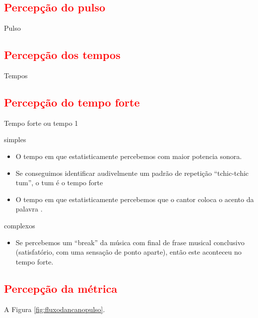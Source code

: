 \subsection{\textcolor{red}{Percepção do pulso}}
Pulso


\subsection{\textcolor{red}{Percepção dos tempos}}
Tempos


\subsection{\textcolor{red}{Percepção do tempo forte}}
Tempo forte ou tempo 1

simples
\begin{itemize}
\item O tempo em que estatisticamente percebemos com maior potencia sonora. 
\item Se conseguimos identificar audivelmente um padrão de repetição ``tchic-tchic tum'', o tum é o tempo forte
\item O tempo em que estatisticamente percebemos que o cantor  coloca o acento da palavra \cite[pp. 149]{medteoria}. 
\end{itemize}

complexos 
\begin{itemize}
\item Se percebemos um ``break'' da música com final de frase musical conclusivo 
(satisfatório, com uma sensação de ponto aparte), então este aconteceu no tempo forte.
\end{itemize}


\subsection{\textcolor{red}{Percepção da métrica}}


A Figura \ref{fig:fluxodancanopulso}.

